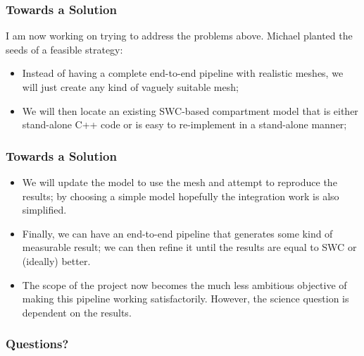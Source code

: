 \documentclass{beamer}
\begin{document}
\begin{frame}
\frametitle{Towards a Solution}

I am now working on trying to address the problems above. Michael
planted the seeds of a feasible strategy:

\begin{itemize}
\item Instead of having a complete end-to-end pipeline with realistic
  meshes, we will just create any kind of vaguely suitable mesh;
\pause
\item We will then locate an existing SWC-based compartment model that
  is either stand-alone C++ code or is easy to re-implement in a
  stand-alone manner;
\end{itemize}

\end{frame}

\begin{frame}
\frametitle{Towards a Solution}

\begin{itemize}
\item We will update the model to use the mesh and attempt to
  reproduce the results; by choosing a simple model hopefully the
  integration work is also simplified.
\pause
\item Finally, we can have an end-to-end pipeline that generates some
  kind of measurable result; we can then refine it until the results
  are equal to SWC or (ideally) better.
\pause
\item The scope of the project now becomes the much less ambitious
  objective of making this pipeline working satisfactorily. However,
  the science question is dependent on the results.
\end{itemize}

\end{frame}

\begin{frame}
\frametitle{Questions?}

\end{frame}

\begin{frame}
  \printbibliography
\end{frame}
\end{document}
